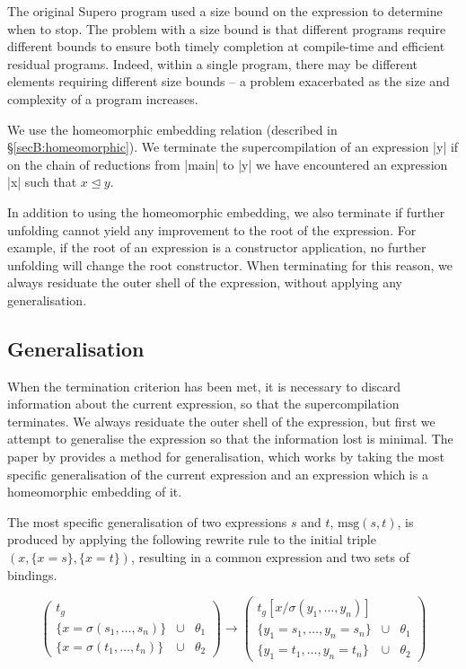 The original Supero program used a size bound on the expression to determine when to stop. The problem with a size bound is that different programs require different bounds to ensure both timely completion at compile-time and efficient residual programs. Indeed, within a single program, there may be different elements requiring different size bounds -- a problem exacerbated as the size and complexity of a program increases.

We use the homeomorphic embedding relation (described in \S\ref{secB:homeomorphic}). We terminate the supercompilation of an expression |y| if on the chain of reductions from |main| to |y| we have encountered an expression |x| such that $x \unlhd y$.

In addition to using the homeomorphic embedding, we also terminate if further unfolding cannot yield any improvement to the root of the expression. For example, if the root of an expression is a constructor application, no further unfolding will change the root constructor. When terminating for this reason, we always residuate the outer shell of the expression, without applying any generalisation.

\subsection{Generalisation}

When the termination criterion has been met, it is necessary to discard information about the current expression, so that the supercompilation terminates. We always residuate the outer shell of the expression, but first we attempt to generalise the expression so that the information lost is minimal. The paper by \citet{sorensen:supercompilation} provides a method for generalisation, which works by taking the most specific generalisation of the current expression and an expression which is a homeomorphic embedding of it.

The most specific generalisation of two expressions $s$ and $t$, $\text{msg}(s,t)$, is produced by applying the following rewrite rule to the initial triple \linebreak $(x,\{x=s\},\{x=t\})$, resulting in a common expression and two sets of bindings.

\[
\left( \begin{array}{lcl}
	t_g \\
	\{x = \sigma(s_1,\ldots,s_n)\} & \cup & \theta_1 \\
	\{x = \sigma(t_1,\ldots,t_n)\} & \cup & \theta_2
	\end{array} \right)
\rightarrow
\left( \begin{array}{lcl}
	t_g[x / \sigma(y_1,\ldots,y_n)] \\
	\{y_1 = s_1,\ldots,y_n = s_n\} & \cup & \theta_1 \\
	\{y_1 = t_1,\ldots,y_n = t_n\} & \cup & \theta_2
	\end{array} \right)
\]


